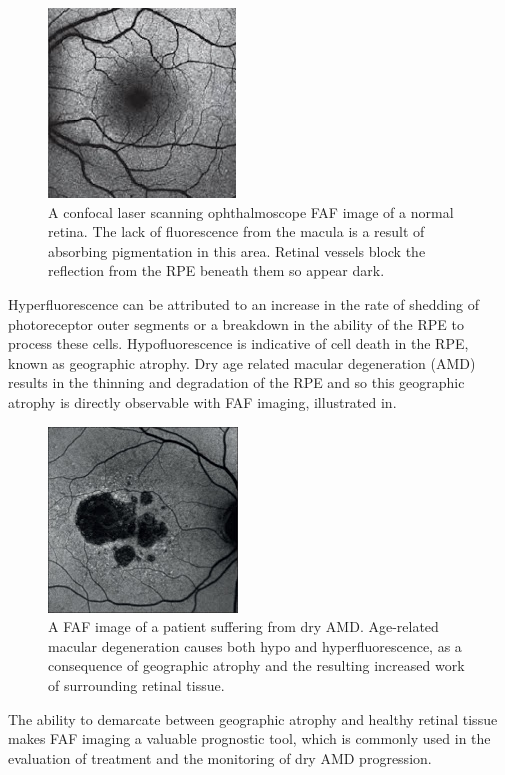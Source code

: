 \begin{figure}[htbp]
\centering
 \includegraphics{figures/faf}
\caption{A confocal laser scanning ophthalmoscope FAF image of a normal retina. The lack of fluorescence from the macula is a result of absorbing pigmentation in this area. Retinal vessels block the reflection from the RPE beneath them so appear dark.}
\label{fig:faf}
    \end{figure}

Hyperfluorescence can be attributed to an increase in the rate of shedding of photoreceptor outer segments or a breakdown in the ability of the RPE to process these cells. Hypofluorescence is indicative of cell death in the RPE, known as geographic atrophy. Dry age related macular degeneration (AMD) results in the thinning and degradation of the RPE and so this geographic atrophy is directly observable with FAF imaging, illustrated in.

\begin{figure}[htbp]
\centering
 \includegraphics{figures/fafamd}
\caption{A FAF image of a patient suffering from dry AMD. Age-related macular degeneration causes both hypo and hyperfluorescence, as a consequence of geographic atrophy and the resulting increased work of surrounding retinal tissue.}
\label{fig:fafamd}
    \end{figure}

The ability to demarcate between geographic atrophy and healthy retinal tissue makes FAF imaging a valuable prognostic tool, which is commonly used in the evaluation of treatment and the monitoring of dry AMD progression.

